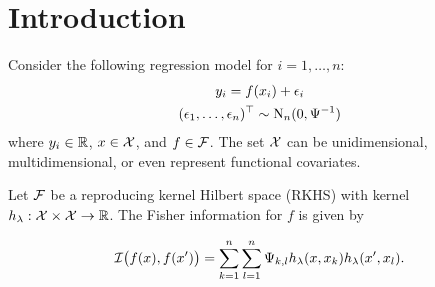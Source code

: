 \documentclass{article}
\begin{document}
\section{Introduction}

Consider the following regression model for $i=1,\dots,n$:
\begin{align}\label{eq:normalmodel}
  \begin{gathered}
      y_i = f(x_i) + \epsilon_i \\
    (\epsilon_1, \dots, \epsilon_n)^\top \sim \operatorname{N}_n(0,\Psi^{-1})
  \end{gathered}
\end{align}
where $y_i \in \mathbb{R}$, $x \in {\mathcal X}$, and $f \in {\mathcal F}$. The set ${\mathcal X}$ can be unidimensional, multidimensional, or even represent functional covariates.


Let ${\mathcal F}$ be a reproducing kernel Hilbert space (RKHS) with kernel $h_\lambda:{\mathcal X} \times {\mathcal X} \to \mathbb{R}$. The Fisher information for $f$ is given by

\begin{align}
  {\mathcal I}\big(f(x), f(x')\big) = \sum_{k=1}^n \sum_{l=1}^n \Psi_{k,l} h_\lambda(x,x_k) h_\lambda(x',x_l).
\end{align}
\end{document}
